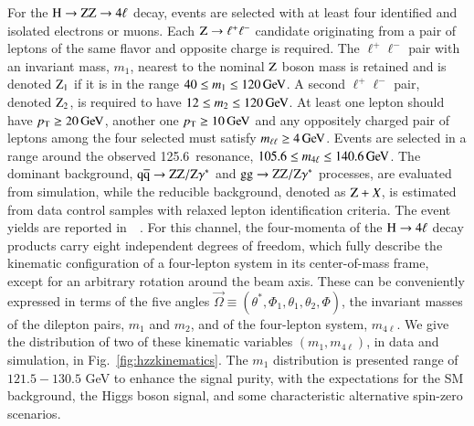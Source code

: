 For the $\mathrm{H}\to\mathrm{Z}\mathrm{Z}\to4\ell$ decay, events are selected with at
least four identified and isolated electrons or muons.  Each $\mathrm{Z}\to
\ell^+\ell^-$ candidate originating from a pair of leptons of the same
flavor and opposite charge is required.  The $\ell^+\ell^-$ pair with
an invariant mass, $m_1$, nearest to the nominal $\mathrm{Z}$ boson mass is
retained and is denoted $\mathrm{Z}_{1}$ if it is in the range $40 \le m_1
\le 120 \,\mathrm{Ge\hspace{-.08em}V}$.  A second $\ell^{+}\ell^{-}$ pair, denoted $\mathrm{Z}_{2}$,
is required to have $12 \le m_2 \le 120 \,\mathrm{Ge\hspace{-.08em}V}$.  At least one lepton
should have $p_{\mathrm{T}} \ge 20 \,\mathrm{Ge\hspace{-.08em}V}$, another one $p_{\mathrm{T}} \ge 10 \,\mathrm{Ge\hspace{-.08em}V}$ and any
oppositely charged pair of leptons among the four selected must
satisfy $m_{\ell\ell} \ge 4 \,\mathrm{Ge\hspace{-.08em}V}$. Events are selected in a range
around the observed 125.6~\GeV resonance, $105.6 \le m_{4\ell} \le
140.6 \,\mathrm{Ge\hspace{-.08em}V}$.
%
The dominant background, $\mathrm{q}\mathrm{\overline{q}} \to \mathrm{Z}\mathrm{Z}/\mathrm{Z}\gamma^*$ and $\mathrm{g}\mathrm{g} \to
\mathrm{Z}\mathrm{Z}/\mathrm{Z}\gamma^*$ processes, are evaluated from simulation, while the
reducible background, denoted as $\mathrm{Z} + X$, is estimated from data
control samples with relaxed lepton identification criteria.
%
The event yields are reported in~~\cite{Chatrchyan:2013mxa}.
%
For this channel, the four-momenta of the $\mathrm{H} \rightarrow
4\mathrm{\ell}$ decay products carry eight independent degrees of
freedom, which fully describe the kinematic configuration of a
four-lepton system in its center-of-mass frame, except for an
arbitrary rotation around the beam axis. These can be conveniently
expressed in terms of the five angles $\vec\Omega\equiv(\theta^*,
\Phi_1, \theta_1, \theta_2, \Phi)$, the invariant masses of the
dilepton pairs, $m_{1}$ and $m_{2}$, and of the four-lepton system,
$m_{4\ell}$.  We give the distribution of two of these kinematic
variables $(m_1, m_{4\ell})$, in data and simulation, in
Fig.~\ref{fig:hzzkinematics}. The $m_1$ distribution is presented
range of $121.5 - 130.5$ GeV to enhance the signal purity, with the
expectations for the SM background, the Higgs boson signal, and some
characteristic alternative spin-zero scenarios.

